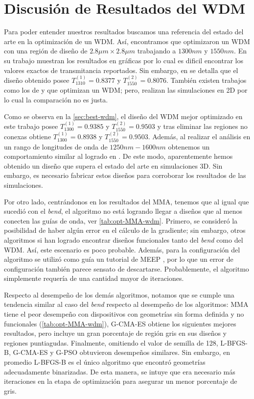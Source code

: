 \section{Discusión de Resultados del WDM}

Para poder entender nuestros resultados buscamos una referencia del estado del arte en la optimización
de un WDM. Así, encontramos que 
\cite{Piggott2015} optimizaron un WDM con una región de diseño de $2.8 \mu m \times 2.8 \mu m$
trabajando a $1300 nm$ y $1550 nm$. En su trabajo muestran los resultados en gráficas por lo cual
es dificil encontrar los valores exactos de transmitancia reportados. Sin embargo, en
\cite{Sigmund2016} se detalla que el diseño obtenido posee 
$T_{1310}^{(1)} = 0.8377$ y $T_{1550}^{(2)} = 0.8076$.
También existen trabajos como los de \cite{Christiansen2021} y \cite{Zhang2021} que optimizan
un WDM; pero, realizan las simulaciones en 2D por lo cual la comparación no es justa.

Como se observa en la \autoref{sec:best-wdm}, el diseño del WDM mejor optimizado en este trabajo posee $T_{1300}^{(1)} = 0.9385$ y 
$T_{1550}^{(2)} = 0.9503$ y tras eliminar las regiones no conexas obtiene
$T_{1300}^{(1)} = 0.8938$ y $T_{1550}^{(2)} = 0.9503$. Además, al realizar el análisis
en un rango de longitudes de onda de $1250nm-1600nm$ obtenemos un comportamiento similar
al logrado en \cite{Piggott2015}.
De este modo, aparentemente hemos obtenido un diseño que supera el estado del arte en
simulaciones 3D.
Sin embargo, es necesario fabricar estos diseños para corroborar los resultados de las simulaciones.

Por otro lado, centrándonos en los resultados del MMA, tenemos que al igual que sucedió con el \emph{bend},
el algoritmo no está logrando llegar a diseños que al menos conecten las guías de onda, 
ver \autoref{tab:opt-MMA-wdm}.
Primero, se consideró la posibilidad de haber algún error en el cálculo de la gradiente;
sin embargo, otros algoritmos si han logrado encontrar diseños funcionales tanto del
\emph{bend} como del WDM. Así, este escenario es poco probable.
Además, para la configuración del algoritmo se utilizó como guía un tutorial de MEEP \citep{Oskooi2010},
por lo que un error de configuración también parece sensato de descartarse.
Probablemente, el algoritmo simplemente requería de una cantidad mayor de iteraciones.

Respecto al desempeño de los demás algoritmos, notamos que se cumple una tendencia similar
al caso del \emph{bend} respecto al desempeño de los algoritmos: MMA tiene el peor
desempeño con dispositivos con geometrías sin forma definida y no funcionales
(\autoref{tab:opt-MMA-wdm}), G-CMA-ES obtiene los siguientes mejores resultados,
pero incluye un gran porcentaje de región gris en sus diseños y regiones puntiagudas.
Finalmente, omitiendo el valor de semilla de 128, L-BFGS-B, G-CMA-ES y G-PSO obtuvieron
desempeños similares.
Sin embargo, en promedio L-BFGS-B es el único algoritmo que encontró geometrías
adecuadamente binarizadas. De esta manera, se intuye que era necesario más iteraciones
en la etapa de optimización para asegurar un menor porcentaje de gris.

